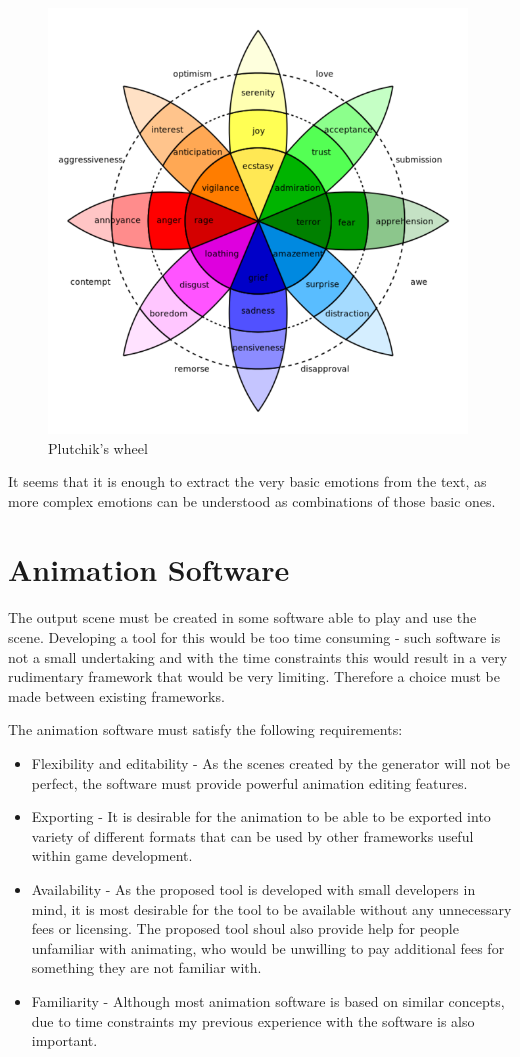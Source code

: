 \begin{figure}[!ht]
\centerline{\includegraphics[width = 30em]{img/wheel.png}}
\caption{Plutchik's wheel}\label{fig:wheel}
\end{figure}

It seems that it is enough to extract the very basic emotions from the text, as more complex emotions can be understood as combinations of those basic ones.


\section{Animation Software}

The output scene must be created in some software able to play and use the scene. Developing a tool for this would be too time consuming - such software is not a small undertaking and with the time constraints this would result in a very rudimentary framework that would be very limiting. Therefore a choice must be made between existing frameworks.

The animation software must satisfy the following requirements:
\begin{itemize}
\item Flexibility and editability - As the scenes created by the generator will not be perfect, the software must provide powerful animation editing features.
\item Exporting - It is desirable for the animation to be able to be exported into variety of different formats that can be used by other frameworks useful within game development.
\item Availability - As the proposed tool is developed with small developers in mind, it is most desirable for the tool to be available without any unnecessary fees or licensing. The proposed tool shoul also provide help for people unfamiliar with animating, who would be unwilling to pay additional fees for something they are not familiar with.
\item Familiarity - Although most animation software is based on similar concepts, due to time constraints my previous experience with the software is also important.
\end{itemize}


